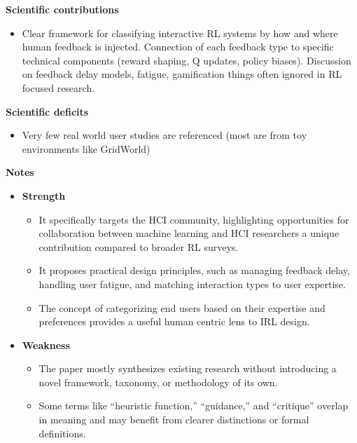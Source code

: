 \documentclass[report.tex]{subfiles}
\begin{document}
\noindent\textbf{Scientific contributions} 
\begin{itemize}
        \item Clear framework for classifying interactive RL systems by how and where human feedback is injected.
         Connection of each feedback type to specific technical components (reward shaping, Q updates, policy biases).
         Discussion on feedback delay models, fatigue, gamification  things often ignored in RL focused research.
        
        
\end{itemize}

\noindent\textbf{Scientific deficits} 
\begin{itemize}
        \item Very few real world user studies are referenced (most are from toy environments like GridWorld)
        
        
       
\end{itemize}

\noindent\textbf{Notes}
\begin{itemize}
    \item \noindent\textbf {Strength}
    \begin{itemize}
        \item It specifically targets the HCI community, highlighting opportunities for collaboration between machine learning and HCI researchers a unique contribution compared to broader RL surveys.
        \item It proposes practical design principles, such as managing feedback delay, handling user fatigue, and matching interaction types to user expertise.

        \item The concept of categorizing end users based on their expertise and preferences provides a useful human centric lens to IRL design.


    \end{itemize}
    
    \item \noindent\textbf{Weakness}
    \begin{itemize}
        \item The paper mostly synthesizes existing research without introducing a novel framework, taxonomy, or methodology of its own.
        \item Some terms like “heuristic function,” “guidance,” and “critique” overlap in meaning and may benefit from clearer distinctions or formal definitions.
    \end{itemize}
\end{itemize}
\end{document}
